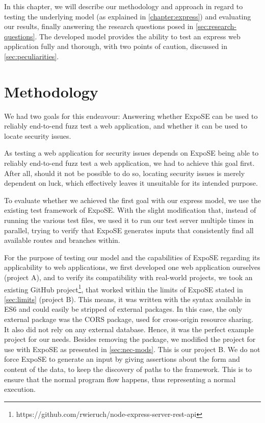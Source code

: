 In this chapter, we will describe our methodology and approach in regard to testing the underlying model (as explained in \autoref{chapter:express}) and evaluating our results, finally answering the research questions posed in \autoref{sec:research-questions}. 
The developed model provides the ability to test an express web application fully and thorough, with two points of caution, discussed in \autoref{sec:peculiarities}.

\section{Methodology} 
We had two goals for this endeavour: Answering whether ExpoSE can be used to reliably end-to-end fuzz test a web application, and whether it can be used to locate security issues.

As testing a web application for security issues depends on ExpoSE being able to reliably end-to-end fuzz test a web application, we had to achieve this goal first. After all, should it not be possible to do so, locating security issues is merely dependent on luck, which effectively leaves it unsuitable for its intended purpose. 

To evaluate whether we achieved the first goal with our express model, we use the existing test framework of ExpoSE. With the slight modification that, instead of running the various test files, we used it to run our test server multiple times in parallel, trying to verify that ExpoSE generates inputs that consistently find all available routes and branches within.


For the purpose of testing our model and the capabilities of ExpoSE regarding its applicability to web applications, we first developed one web application ourselves (project A), and to verify its compatibility with real-world projects, we took an existing GitHub project\footnote{https://github.com/rwieruch/node-express-server-rest-api}, that worked within the limits of ExpoSE stated in \autoref{sec:limits} (project B). This means, it was written with the syntax available in ES6 and could easily be stripped of external packages. In this case, the only external package was the CORS package, used for cross-origin resource sharing. It also did not rely on any external database. Hence, it was the perfect example project for our needs. Besides removing the package, we modified the project for use with ExpoSE as presented in \autoref{sec:nec-mods}. This is our project B.
We do not force ExpoSE to generate an input by giving assertions about the form and content of the data, to keep the discovery of paths to the framework. This is to ensure that the normal program flow happens, thus representing a normal execution. 


